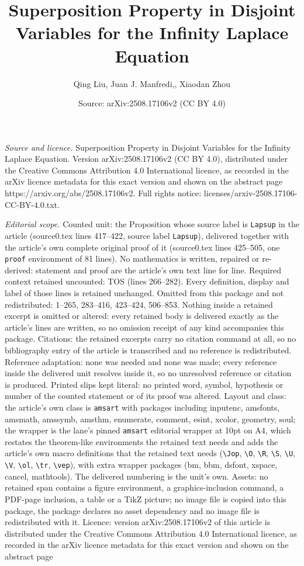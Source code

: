 \documentclass[10pt,a4paper]{amsart}
\title[Superposition Property in Disjoint Variables for the Infinit]{Superposition Property in Disjoint Variables for the Infinity Laplace Equation}
\author{Qing Liu, Juan J. Manfredi,, Xiaodan Zhou}
\date{Source: arXiv:2508.17106v2 (CC BY 4.0)}
\begin{document}
\maketitle

\noindent\emph{Source and licence.} Superposition Property in Disjoint Variables for the Infinity Laplace Equation. Version arXiv:2508.17106v2 (CC BY 4.0), distributed under the Creative Commons Attribution 4.0 International licence, as recorded in the arXiv licence metadata for this exact version and shown on the abstract page https://arxiv.org/abs/2508.17106v2. Full rights notice: licenses/arxiv-2508.17106-CC-BY-4.0.txt.\par\smallskip

\noindent\textit{Editorial scope.} Counted unit: the Proposition whose source label is \texttt{Lapsup} in the article (source0.tex lines 417--422, source label \texttt{Lapsup}), delivered together with the article's own complete original proof of it (source0.tex lines 425--505, one \texttt{proof} environment of 81 lines). No mathematics is written, repaired or re-derived: statement and proof are the article's own text line for line. Required context retained uncounted: TOS (lines 266--282). Every definition, display and label of those lines is retained unchanged. Omitted from this package and not redistributed: 1--265, 283--416, 423--424, 506--853. Nothing inside a retained excerpt is omitted or altered: every retained body is delivered exactly as the article's lines are written, so no omission receipt of any kind accompanies this package. Citations: the retained excerpts carry no citation command at all, so no bibliography entry of the article is transcribed and no reference is redistributed. Reference adaptation: none was needed and none was made; every reference inside the delivered unit resolves inside it, so no unresolved reference or citation is produced. Printed slips kept literal: no printed word, symbol, hypothesis or number of the counted statement or of its proof was altered. Layout and class: the article's own class is \texttt{amsart} with packages including inputenc, amsfonts, amsmath, amssymb, amsthm, enumerate, comment, esint, xcolor, geometry, soul; the wrapper is the lane's pinned \texttt{amsart} editorial wrapper at 10pt on A4, which restates the theorem-like environments the retained text needs and adds the article's own macro definitions that the retained text needs (\texttt{\textbackslash Jop}, \texttt{\textbackslash O}, \texttt{\textbackslash R}, \texttt{\textbackslash S}, \texttt{\textbackslash U}, \texttt{\textbackslash V}, \texttt{\textbackslash ol}, \texttt{\textbackslash tr}, \texttt{\textbackslash vep}), with extra wrapper packages (bm, bbm, dsfont, xspace, cancel, mathtools). The delivered numbering is the unit's own. Assets: no retained span contains a figure environment, a graphics-inclusion command, a PDF-page inclusion, a table or a TikZ picture; no image file is copied into this package, the package declares no asset dependency and no image file is redistributed with it. Licence: version arXiv:2508.17106v2 of this article is distributed under the Creative Commons Attribution 4.0 International licence, as recorded in the arXiv licence metadata for this exact version and shown on the abstract page 
\end{document}
